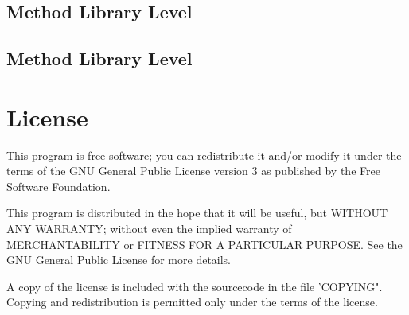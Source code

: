 \documentclass{article}
\begin{document}
\subsection{Method Library Level}

\subsection{Method Library Level}

\section{License}
This program is free software; you can redistribute it and/or modify it under the terms of the GNU General Public License version 3 as published by the Free Software Foundation.

This program is distributed in the hope that it will be useful, but WITHOUT ANY WARRANTY; without even the implied warranty of MERCHANTABILITY or FITNESS FOR A PARTICULAR PURPOSE. See the GNU General Public License for more details.

A copy of the license is included with the sourcecode in the file 'COPYING". Copying and redistribution is permitted only under the terms of the license.



\end{document}
